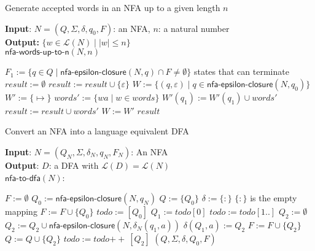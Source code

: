 \documentclass[11pt]{article}
\newcommand*{\Language}[1]{\ensuremath{\mathcal{L}(#1)}}
\newcommand{\emptymap}{\ensuremath{\{ \mapsto \}}}
\newcommand{\concat}{\ensuremath{+\!\!+\:}}
\begin{document}
\begin{algorithm}
\small
\caption{Generate accepted words in an NFA up to a given length $n$}
\vspace*{1ex}
{\textbf{Input}:} $N = (Q, \Sigma, \delta, q_0, F)$: an NFA, $n$: a natural number \\
\textbf{Output:}
$ \{ w \in \Language{N} \mid |w| \leq n \} $ \\

$\textsf{nfa-words-up-to-n}(N, n)$
\begin{algorithmic}[1]

\State $F_1 := \{ q \in Q \mid \textsf{nfa-epsilon-closure}(N, q) \cap F \neq \emptyset \}$
  \Comment states that can terminate
\State $result := \emptyset$
  \State $result := result \cup \{ \varepsilon \}$
\EndIf
\State $W := \{ (q, \varepsilon) \mid q \in \textsf{nfa-epsilon-closure}(N, q_0) \}$
  \State $W' := \emptymap$
        \State $words' := \{ wa \mid w \in words \}$
        \State $W'(q_1) := W'(q_1) \cup words'$
          \State $result := result \cup words'$
        \EndIf
      \EndFor
    \EndFor
  \EndFor
  \State $W := W'$
\EndFor
\State \Return $result$
\end{algorithmic}
\end{algorithm}

\begin{algorithm}
\small
\caption{Convert an NFA into a language equivalent DFA }
\vspace*{1ex}
{\textbf{Input}:} 
$N = (Q_N, \Sigma, \delta_N, q_N, F_N)$: An NFA \\
{\textbf{Output}:} 
$D$: a DFA with $\Language{D} = \Language{N}$\\

$\textsf{nfa-to-dfa}(N)$:
\begin{algorithmic}[1]
\State $F := \emptyset$
\State $Q_0 := \textsf{nfa-epsilon-closure}(N,q_N)$
\State $Q := \{ Q_0 \}$
\State $\delta := \{:\}$ \Comment $\{:\}$ is the empty mapping
  \State $F := F \cup \{ Q_0 \}$
\EndIf
\State $todo := [ Q_0 ]$
  \State $Q_1 := todo[0]$
  \State $todo := todo[1..]$
    \State $Q_2 := \emptyset$
      \State $Q_2 := Q_2 \cup \textsf{nfa-epsilon-closure}(N, \delta_N(q_1, a))$
    \EndFor
    \State $\delta(Q_1, a) := Q_2$
      \State $F := F \cup \{ Q_2 \}$
    \EndIf
      \State $Q := Q \cup \{ Q_2 \}$
      \State $todo := todo \concat [Q_2]$
    \EndIf
  \EndFor
\EndWhile
\State \Return $(Q, \Sigma, \delta, Q_0, F)$
\end{algorithmic}
\end{algorithm}
\end{document}
